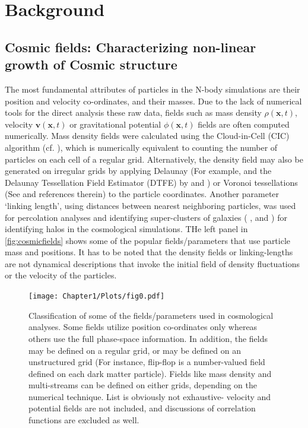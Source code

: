 \chapter{Background}\label{chapter2}


\section{Cosmic fields: Characterizing non-linear growth of Cosmic structure}


The most fundamental attributes of particles in the N-body simulations are their position and velocity co-ordinates, and their masses. Due to the lack of numerical tools for the direct analysis these raw data, fields such as mass density $\rho(\mathbf{x}, t)$, velocity $\mathbf{v}(\mathbf{x}, t)$ or gravitational potential $\phi(\mathbf{x}, t)$ fields are often computed numerically. Mass density fields were calculated using the Cloud-in-Cell (CIC) algorithm (cf. \citealt{Hockney1988}), which is numerically equivalent to counting the number of particles on each cell of a regular grid. Alternatively, the density field may also be generated on irregular grids by applying Delaunay (For example, \citealt{Icke1991} and the Delaunay Tessellation Field Estimator (DTFE) by \citealt{Schaap2000} and \citealt{Weygaert2009a}) or Voronoi tessellations (See \citealt{Schaap2000} and references therein) to the particle coordinates. Another parameter `linking length', using distances between nearest neighboring particles, was used for percolation analyses and identifying super-clusters of galaxies ( \citealt{Zeldovich1982}, \citealt{Shandarin1983} and \citealt{Shandarin1983b}) for identifying halos \citealt{Davis1985} in the cosmological simulations. THe left panel in \autoref{fig:cosmicfields} shows some of the popular fields/parameters that use particle mass and positions. It has to be noted that the density fields or linking-lengths are not dynamical descriptions that invoke the initial field of density fluctuations or the velocity of the particles. 


\begin{figure}
\begin{minipage}[t]{0.99\linewidth}
 \centering\texttt{[image: Chapter1/Plots/fig0.pdf]} 
\end{minipage}\hfill
{}
\caption{Classification of some of the fields/parameters used in cosmological analyses. Some fields utilize position co-ordinates only whereas others use the full phase-space information. In addition, the fields may be defined on a regular grid, or may be defined on an unstructured grid (For instance, flip-flop is a number-valued field defined on each dark matter particle). Fields like mass density and multi-streams can be defined on either grids, depending on the numerical technique. List is obviously not exhaustive- velocity and potential fields are not included, and discussions of correlation functions are excluded as well.}
\label{fig:cosmicfields}
\end{figure}


